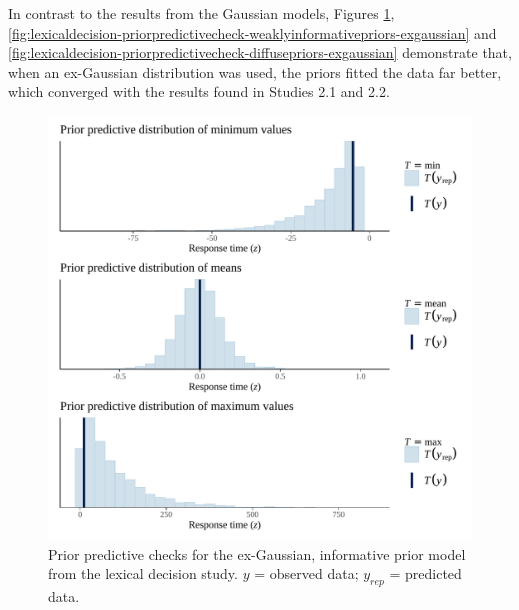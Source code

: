 \documentclass[
  12pt,
  man,floatsintext]{apa7}
\begin{document}
In contrast to the results from the Gaussian models, Figures \ref{fig:lexicaldecision-priorpredictivecheck-informativepriors-exgaussian}, \ref{fig:lexicaldecision-priorpredictivecheck-weaklyinformativepriors-exgaussian} and \ref{fig:lexicaldecision-priorpredictivecheck-diffusepriors-exgaussian} demonstrate that, when an ex-Gaussian distribution was used, the priors fitted the data far better, which converged with the results found in Studies 2.1 and 2.2.



\begin{figure}

{\centering \includegraphics[width=0.8\linewidth]{../lexicaldecision/bayesian_analysis/prior_predictive_checks/plots/lexicaldecision_priorpredictivecheck_informativepriors_exgaussian} 

}

\caption{Prior predictive checks for the ex-Gaussian, informative prior model from the lexical decision study. \(y\) = observed data; \(y_{rep}\) = predicted data.}\label{fig:lexicaldecision-priorpredictivecheck-informativepriors-exgaussian}
\end{figure}
\end{document}
